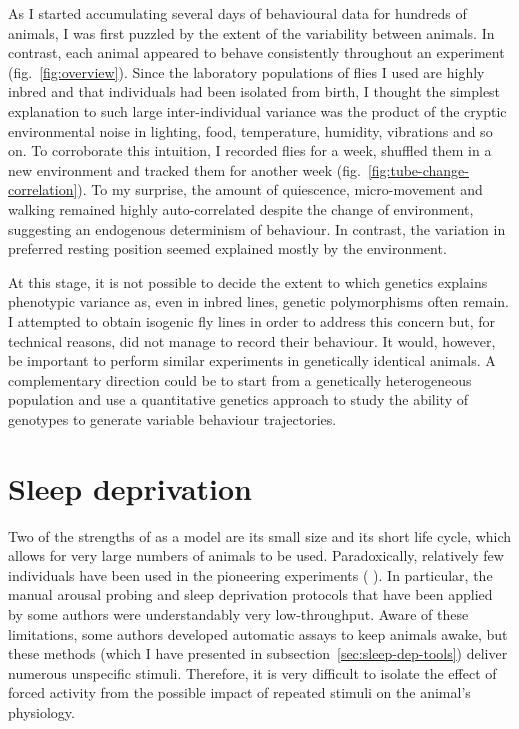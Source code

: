 As I started accumulating several days of behavioural data for hundreds of animals, I was first puzzled by the extent of the variability between animals. 
In contrast, each animal appeared to behave consistently throughout an experiment (fig.~\ref{fig:overview}).
Since the laboratory populations of flies I used are highly inbred and that individuals had been isolated from birth,  I thought the simplest explanation to such large inter-individual variance was the product of the cryptic environmental noise in lighting, food, temperature, humidity, vibrations and so on.
To corroborate this intuition, I recorded flies for a week, shuffled them in a new environment and tracked them for another week (fig.~\ref{fig:tube-change-correlation}).
To my surprise, the amount of quiescence, micro-movement and walking remained highly auto-correlated despite the change of environment, suggesting an endogenous determinism of behaviour.
In contrast, the variation in preferred resting position seemed explained mostly by the environment.

At this stage, it is not possible to decide the extent to which genetics explains phenotypic variance 
as, even in inbred lines, genetic polymorphisms often remain\cite{lewontin_general_1958,fitzpatrick_maintaining_2007}.
I attempted to obtain isogenic fly lines in order to address this concern
but, for technical reasons, did not manage to record their behaviour.
It would, however, be important to perform similar experiments in genetically identical animals.
A complementary direction could be to start from a genetically heterogeneous population and use a quantitative genetics approach to study the ability of genotypes to generate variable behaviour trajectories.


\newpage
\section{Sleep deprivation}
Two of the strengths of \droso{} as a model are its small size and its short life cycle, which allows for very large numbers of animals to be used.
Paradoxically, relatively few individuals have been used in the pioneering experiments (\eg{} \cite{hendricks_need_2000, shaw_correlates_2000, shaw_stress_2002, huber_sleep_2004}).
In particular, the manual arousal probing and sleep deprivation protocols that have been applied by some authors were understandably very low-throughput\cite{hendricks_need_2000,shaw_stress_2002}.
Aware of these limitations, some authors developed automatic assays to keep animals awake, but these methods (which I have presented in subsection~\ref{sec:sleep-dep-tools}) deliver numerous unspecific stimuli. 
Therefore, it is very difficult to isolate the effect of forced activity from the possible impact of repeated stimuli on the animal's physiology.

